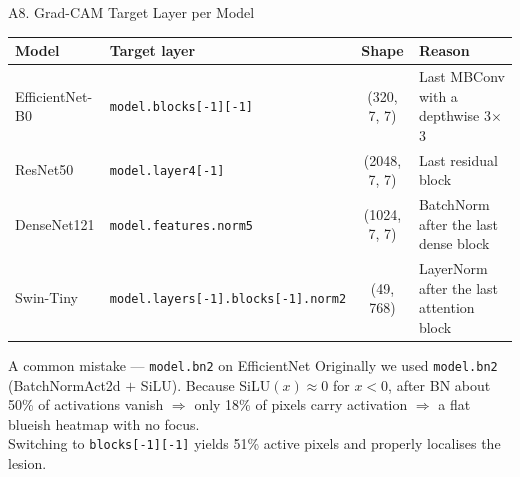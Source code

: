 \documentclass[10pt, aspectratio=169]{beamer}
\begin{document}
\begin{frame}{A8. Grad-CAM Target Layer per Model}
    \scriptsize
    \begin{table}[]
        \centering
        \begin{tabular}{llcl}
        \toprule
        \rowcolor{usthblue!25} \textbf{Model} & \textbf{Target layer} & \textbf{Shape} & \textbf{Reason} \\
        \midrule
        EfficientNet-B0 & \texttt{model.blocks[-1][-1]}         & (320, 7, 7) & Last MBConv with a depthwise 3$\times$3 \\
        ResNet50        & \texttt{model.layer4[-1]}             & (2048, 7, 7) & Last residual block \\
        DenseNet121     & \texttt{model.features.norm5}         & (1024, 7, 7) & BatchNorm after the last dense block \\
        Swin-Tiny       & \texttt{model.layers[-1].blocks[-1].norm2} & (49, 768) & LayerNorm after the last attention block \\
        \bottomrule
        \end{tabular}
    \end{table}

    \vspace{0.3cm}
    \begin{block}{A common mistake --- \texttt{model.bn2} on EfficientNet}
        \footnotesize
        Originally we used \texttt{model.bn2} (BatchNormAct2d $+$ SiLU). Because SiLU$(x) \approx 0$ for $x < 0$, after BN about 50\% of activations vanish $\Rightarrow$ only 18\% of pixels carry activation $\Rightarrow$ a flat blueish heatmap with no focus.\\
        Switching to \texttt{blocks[-1][-1]} yields 51\% active pixels and properly localises the lesion.
    \end{block}
\end{frame}
\end{document}
